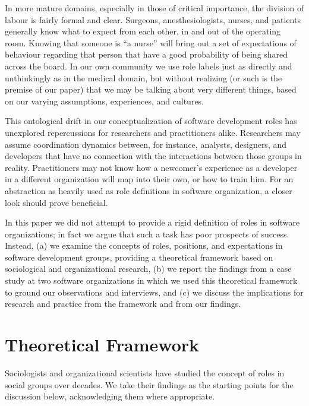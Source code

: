 \documentclass[10pt, conference, compsocconf]{IEEEtran}
\begin{document}
In more mature domains, especially in those of critical importance, the division of labour is fairly formal and clear. Surgeons, anesthesiologists, nurses, and patients generally know what to expect from each other, in and out of the operating room. Knowing that someone is ``a nurse'' will bring out a set of expectations of behaviour regarding that person that have a good probability of being shared across the board. In our own community we use role labels just as directly and unthinkingly as in the medical domain, but without realizing (or such is the premise of our paper) that we may be talking about very different things, based on our varying assumptions, experiences, and cultures.

This ontological drift \cite{Robinson1991} in our conceptualization of software development roles has unexplored repercussions for researchers and practitioners alike. Researchers may assume coordination dynamics between, for instance, analysts, designers, and developers that have no connection with the interactions between those groups in reality. Practitioners may not know how a newcomer's experience as a developer in a different organization will map into their own, or how to train him. For an abstraction as heavily used as role definitions in software organization, a closer look should prove beneficial.

In this paper we did not attempt to provide a rigid definition of roles in software organizations; in fact we argue that such a task has poor prospects of success. Instead, (a) we examine the concepts of roles, positions, and expectations in software development groups, providing a theoretical framework based on sociological and organizational research, (b) we report the findings from a case study at two software organizations in which we used this theoretical framework to ground our observations and interviews, and (c) we discuss the implications for research and practice from the framework and from our findings.



\section{Theoretical Framework}

Sociologists and organizational scientists have studied the concept of roles in social groups over decades. We take their findings as the starting points for the discussion below, acknowledging them where appropriate.
\end{document}
